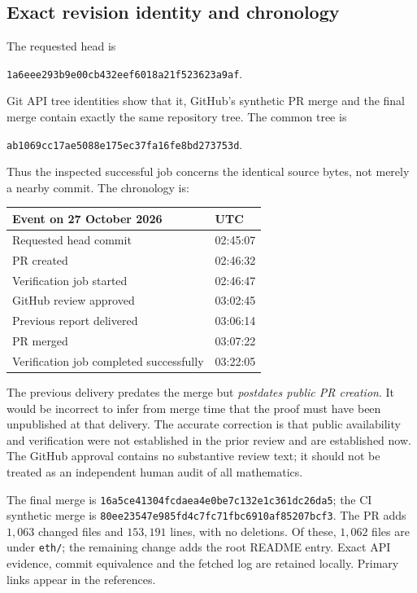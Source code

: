 \documentclass[11pt,letterpaper]{article}
\theoremstyle{remark}\newtheorem{remark}[theorem]{Remark}
\newcommand{\APin}{1a6eee293b9e00cb432eef6018a21f523623a9af}
\begin{document}
\subsection{Exact revision identity and chronology}
The requested head is
\begin{center}\small\texttt{\APin}.\end{center}
Git API tree identities show that it, GitHub's synthetic PR merge and the final merge contain exactly the same repository tree. The common tree is
\begin{center}\small\texttt{ab1069cc17ae5088e175ec37fa16fe8bd273753d}.\end{center}
Thus the inspected successful job concerns the identical source bytes, not merely a nearby commit. The chronology is:
\begin{center}\small
\begin{tabular}{@{}ll@{}}\toprule
Event on 27 October 2026 & UTC\\\midrule
Requested head commit &02:45:07\\
PR created &02:46:32\\
Verification job started &02:46:47\\
GitHub review approved &03:02:45\\
Previous report delivered &03:06:14\\
PR merged &03:07:22\\
Verification job completed successfully &03:22:05\\\bottomrule
\end{tabular}
\end{center}
The previous delivery predates the merge but \emph{postdates public PR creation}. It would be incorrect to infer from merge time that the proof must have been unpublished at that delivery. The accurate correction is that public availability and verification were not established in the prior review and are established now. The GitHub approval contains no substantive review text; it should not be treated as an independent human audit of all mathematics.

The final merge is \texttt{16a5ce41304fcdaea4e0be7c132e1c361dc26da5}; the CI synthetic merge is \texttt{80ee23547e985fd4c7fc71fbc6910af85207bcf3}. The PR adds $1{,}063$ changed files and $153{,}191$ lines, with no deletions. Of these, $1{,}062$ files are under \texttt{eth/}; the remaining change adds the root README entry. Exact API evidence, commit equivalence and the fetched log are retained locally. Primary links appear in the references.
\end{document}

